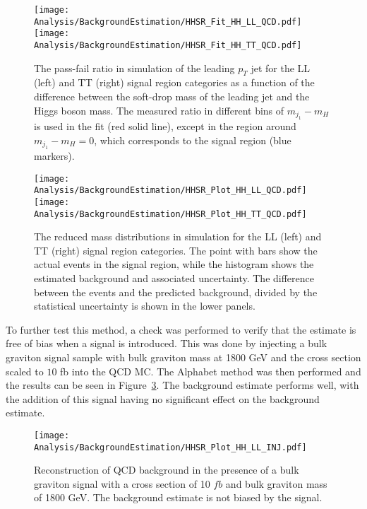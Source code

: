 \begin{figure}[h!]
\centering
\texttt{[image: Analysis/BackgroundEstimation/HHSR\_Fit\_HH\_LL\_QCD.pdf]}
\texttt{[image: Analysis/BackgroundEstimation/HHSR\_Fit\_HH\_TT\_QCD.pdf]}\\
  \caption{The pass-fail ratio in simulation of the leading $p_{T}$ jet for the LL (left) and TT (right) signal region categories as a function of the difference between the soft-drop mass of the leading jet and the Higgs boson mass. The measured ratio in different bins of $m_{j_{1}}-m_{H}$ is used in the fit (red solid line), except in the region around $m_{j_{1}}-m_{H}=0$, which corresponds to the signal region (blue markers). }
\label{fig:QCD_Rpf}
\end{figure}

\begin{figure}[h!]
\centering
\texttt{[image: Analysis/BackgroundEstimation/HHSR\_Plot\_HH\_LL\_QCD.pdf]}
\texttt{[image: Analysis/BackgroundEstimation/HHSR\_Plot\_HH\_TT\_QCD.pdf]}\\
  \caption{The reduced mass distributions in simulation for the LL (left) and TT (right) signal region categories. The point with bars show the actual events in the signal region, while the histogram shows the estimated background and associated uncertainty. The difference between the events and the predicted background, divided by the statistical uncertainty is shown in the lower panels.}
\label{fig:QCD_Background}
\end{figure}

To further test this method, a check was performed to verify that the estimate is free of bias when a signal is introduced. This was done by injecting a bulk graviton signal sample with bulk graviton mass at 1800 GeV and the cross section scaled to $10$ fb into the QCD MC. The Alphabet method was then performed and the results can be seen in Figure~\ref{fig:INJ}. The background estimate performs well, with the addition of this signal having no significant effect on the background estimate.

\begin{figure}[h!]
  \centering
    \texttt{[image: Analysis/BackgroundEstimation/HHSR\_Plot\_HH\_LL\_INJ.pdf]}
  \caption{Reconstruction of QCD background in the presence of a bulk graviton signal with a cross section of 10 $fb$ and bulk graviton mass of 1800 GeV. The background estimate is not biased by the signal.} \label{fig:INJ}
\end{figure}


